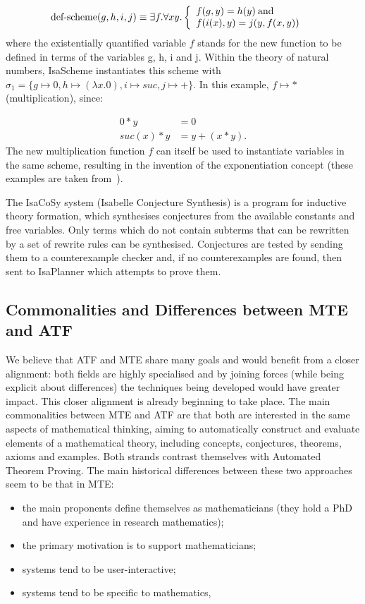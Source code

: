 \[
\text{def-scheme}(g,h,i,j) \equiv\\
  \exists f. \forall x y. \left\{
  \begin{array}{l l}
    f(g,y) = h (y)  \: \text{and}  & \\
    f(i(x),y) = j(y,f(x,y)) & \\
  \end{array} \right.
\]
where the existentially quantified variable $f$ stands for the new
function to be defined in terms of the variables g, h, i and j. Within
the theory of natural numbers, IsaScheme instantiates this scheme with
$\sigma_1 = \{g \mapsto 0, h \mapsto (\lambda x.0), i \mapsto suc, j
\mapsto +\}$. In this example, $f \mapsto *$ (multiplication), since:

\begin{align*}
0*y  &= 0 \\
suc(x) * y &=y + (x*y).
\end{align*}
The new multiplication function $f$ can itself be used to instantiate
variables in the same scheme, resulting in the invention of the
exponentiation concept (these examples are taken from~\cite{MontanoRivas2011}).

The IsaCoSy system (Isabelle Conjecture Synthesis) is a program for
inductive theory formation, which synthesises conjectures from the
available constants and free variables. Only terms which do not
contain subterms that can be rewritten by a set of rewrite rules can
be synthesised.  Conjectures are tested by sending them to a
counterexample checker and, if no counterexamples are found, then sent
to IsaPlanner which attempts to prove them.


\subsection{Commonalities and Differences between MTE and ATF}

We believe that ATF and MTE share many goals and would benefit from a
closer alignment: both fields are highly specialised and by joining
forces (while being explicit about differences) the techniques being
developed would have greater impact. This closer alignment is already
beginning to take place. The main commonalities between MTE and ATF
are that both are interested in the same aspects of mathematical
thinking, aiming to automatically construct and evaluate elements of a
mathematical theory, including concepts, conjectures, theorems, axioms
and examples. Both strands contrast themselves with Automated Theorem
Proving. The main historical differences between these two approaches
seem to be that in MTE:
\begin{itemize}
\item the main proponents define themselves as mathematicians (they
  hold a PhD and have experience in research mathematics);
\item the primary motivation is to support mathematicians;
\item systems tend to be user-interactive;
\item systems tend to be specific to mathematics,
\end{itemize}

